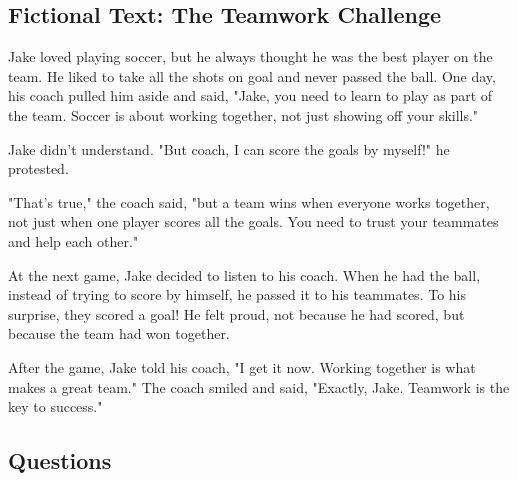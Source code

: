 \documentclass[12pt]{article}
\begin{document}
\onehalfspacing


\subsection*{Fictional Text: The Teamwork Challenge}

\begin{tcolorbox}[colframe=black!40, colback=gray!5]

\begin{spacing}{1.15}
    Jake loved playing soccer, but he always thought he was the best player on the team. He liked to take all the shots on goal and never passed the ball. One day, his coach pulled him aside and said, "Jake, you need to learn to play as part of the team. Soccer is about working together, not just showing off your skills." 

    Jake didn't understand. "But coach, I can score the goals by myself!" he protested. 

    "That's true," the coach said, "but a team wins when everyone works together, not just when one player scores all the goals. You need to trust your teammates and help each other."

    At the next game, Jake decided to listen to his coach. When he had the ball, instead of trying to score by himself, he passed it to his teammates. To his surprise, they scored a goal! He felt proud, not because he had scored, but because the team had won together.

    After the game, Jake told his coach, "I get it now. Working together is what makes a great team." The coach smiled and said, "Exactly, Jake. Teamwork is the key to success."

\end{spacing}

\end{tcolorbox}

\vspace{1cm}

\vspace{2cm}

\subsection*{Questions}
\end{document}
